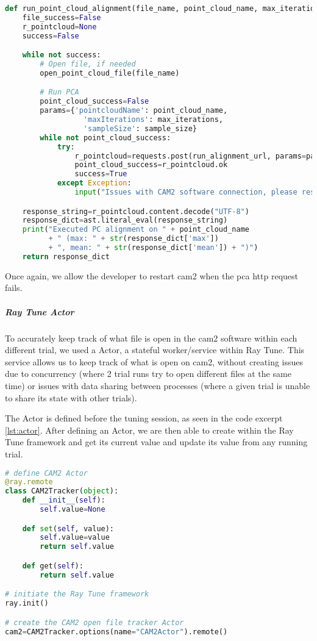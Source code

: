 \begin{lstlisting}[language=Python, caption=Running \acrshort{pca} function in \acrshort{cam2}, captionpos=b, label={lst:cam2_file}]
def run_point_cloud_alignment(file_name, point_cloud_name, max_iterations, sample_size):
    file_success=False
    r_pointcloud=None
    success=False

    while not success:
        # Open file, if needed
        open_point_cloud_file(file_name)

        # Run PCA
        point_cloud_success=False
        params={'pointcloudName': point_cloud_name,
                  'maxIterations': max_iterations,
                  'sampleSize': sample_size}
        while not point_cloud_success:
            try:
                r_pointcloud=requests.post(run_alignment_url, params=params)
                point_cloud_success=r_pointcloud.ok
                success=True
            except Exception:
                input("Issues with CAM2 software connection, please restart the CAM2 software.")

    response_string=r_pointcloud.content.decode("UTF-8")
    response_dict=ast.literal_eval(response_string)
    print("Executed PC alignment on " + point_cloud_name
          + " (max: " + str(response_dict['max'])
          + ", mean: " + str(response_dict['mean']) + ")")
    return response_dict
\end{lstlisting}

Once again, we allow the developer to restart \acrshort{cam2} when the \acrshort{pca} \acrshort{http} request fails.

\subparagraph{Ray Tune Actor}

To accurately keep track of what file is open in the \acrshort{cam2} software within each different trial, we used a Actor, a stateful worker/service within Ray Tune. This service allows us to keep track of what is open on \acrshort{cam2}, without creating issues due to concurrency (where 2 trial runs try to open different files at the same time) or issues with data sharing between processes (where a given trial is unable to share its state with other trials). 

The Actor is defined before the tuning session, as seen in the code excerpt \ref{lst:actor}. After defining an Actor, we are then able to create within the Ray Tune framework and get its current value and update its value from any running trial.

\begin{lstlisting}[language=Python, caption=Initiating a Ray Tune Actor, captionpos=b, label={lst:actor}]
# define CAM2 Actor
@ray.remote
class CAM2Tracker(object):
    def __init__(self):
        self.value=None

    def set(self, value):
        self.value=value
        return self.value

    def get(self):
        return self.value

# initiate the Ray Tune framework
ray.init()

# create the CAM2 open file tracker Actor
cam2=CAM2Tracker.options(name="CAM2Actor").remote()
\end{lstlisting}

